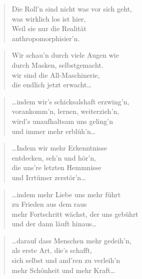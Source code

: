 \documentclass[10pt,a4paper]{article}
\begin{document}
\begin{multicols}{2}
\begin{verse}
Die Roll’n sind nicht was vor sich geht, \\
was wirklich los ist hier, \\
Weil sie nur die Realität \\
anthropomorphisier’n. \\
\end{verse}

\begin{verse}
Wir schau’n durch viele Augen wie \\
durch Masken, selbstgemacht. \\
wir sind die All-Maschinerie, \\
die endlich jetzt erwacht… \\
\end{verse}

\begin{verse}
…indem wir’s schicksalshaft erzwing’n, \\
vorankomm’n, lernen, weiterzieh’n, \\
wird’s unaufhaltsam uns geling’n \\
und immer mehr erblüh’n… \\
\end{verse}

\begin{verse}
…Indem wir mehr Erkenntnisse \\
entdecken, seh’n und hör’n, \\
die uns’re letzten Hemmnisse \\
und Irrtümer zerstör’n… \\
\end{verse}

\begin{verse}
…indem mehr Liebe uns mehr führt \\
zu Frieden aus dem raus \\
mehr Fortschritt wächst, der uns gebührt \\
und der dann läuft hinaus… \\
\end{verse}

\begin{verse}
…darauf dass Menschen mehr gedeih’n, \\
als erste Art, die’s schafft, \\
sich selbst und and’ren zu verleih’n \\
mehr Schönheit und mehr Kraft… \\
\end{verse}


\end{multicols}
\end{document}
